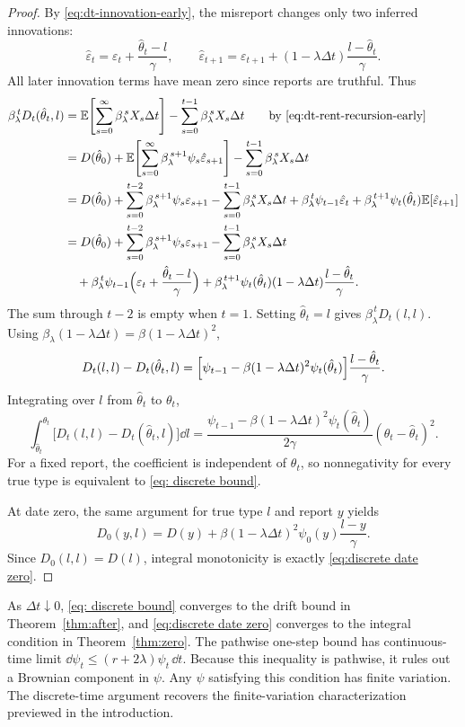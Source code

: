 \documentclass[12pt]{article}
\newcommand{\E}{\mathbb{E}}
\newcommand{\hth}{\hat\theta}
\begin{document}
\begin{proof}
\noindent By \eqref{eq:dt-innovation-early}, the misreport changes only two
inferred innovations:
\[
  \hat\varepsilon_t
  =\varepsilon_t+\frac{\hth_t-l}{\gamma},
  \qquad
  \hat\varepsilon_{t+1}
  =\varepsilon_{t+1}+(1-\lambda\Delta t)\frac{l-\hth_t}{\gamma}.
\]
All later innovation terms have
mean zero since reports are truthful. Thus
\begin{align*}
  \beta_\lambda^{\,t}D_t(\hth_t,l)
  &=\E\!\left[\sum_{s=0}^{\infty}
    \beta_\lambda^{\,s}X_s\Delta t\right]
    -\sum_{s=0}^{t-1}\beta_\lambda^{\,s}X_s\Delta t
    \qquad\text{by \eqref{eq:dt-rent-recursion-early}}\\
  &=D(\hth_0)
    +\E\!\left[\sum_{s=0}^{\infty}
      \beta_\lambda^{\,s+1}\psi_s\hat\varepsilon_{s+1}\right]
    -\sum_{s=0}^{t-1}\beta_\lambda^{\,s}X_s\Delta t\\
  &=D(\hth_0)
    +\sum_{s=0}^{t-2}\beta_\lambda^{\,s+1}\psi_s\varepsilon_{s+1}
    -\sum_{s=0}^{t-1}\beta_\lambda^{\,s}X_s\Delta t +\beta_\lambda^{\,t}\psi_{t-1}\hat\varepsilon_t
    +\beta_\lambda^{\,t+1}\psi_t(\hth_t)\E[\hat\varepsilon_{t+1}]\\
  &=D(\hth_0)
  +\sum_{s=0}^{t-2}\beta_\lambda^{\,s+1}\psi_s\varepsilon_{s+1}
  -\sum_{s=0}^{t-1}\beta_\lambda^{\,s}X_s\Delta t\\
  & \quad+\beta_\lambda^{\,t}\psi_{t-1}
   \Bigl(\varepsilon_t+\frac{\hth_t-l}{\gamma}\Bigr)
  +\beta_\lambda^{\,t+1}\psi_t(\hth_t)(1-\lambda\Delta t)
   \frac{l-\hth_t}{\gamma}.
\end{align*}
The sum through \(t-2\) is empty when \(t=1\). Setting \(\hth_t=l\) gives
\(\beta_\lambda^{\,t}D_t(l,l)\).  Using
\(\beta_\lambda(1-\lambda\Delta t)=\beta(1-\lambda\Delta t)^2\),
\[
  D_t(l,l)-D_t(\hth_t,l)
  =
  \Bigl[\psi_{t-1}-\beta(1-\lambda\Delta t)^2\psi_t(\hth_t)\Bigr]
  \frac{l-\hth_t}{\gamma}.
\]
Integrating over \(l\) from \(\hth_t\) to \(\theta_t\),
\[
  \int_{\hth_t}^{\theta_t}
  \bigl[D_t(l,l)-D_t(\hth_t,l)\bigr]\dd l
  =
  \frac{\psi_{t-1}-\beta(1-\lambda\Delta t)^2\psi_t(\hth_t)}{2\gamma}
  (\theta_t-\hth_t)^2.
\]
For a fixed report, the coefficient is independent of \(\theta_t\),
so nonnegativity for every true type is equivalent to
\eqref{eq: discrete bound}.

At date zero, the same argument for true type \(l\) and report \(y\)
yields
\[
  D_0(y,l)=D(y)+\beta(1-\lambda\Delta t)^2\psi_0(y)
  \frac{l-y}{\gamma}.
\]
Since \(D_0(l,l)=D(l)\), integral monotonicity is exactly
\eqref{eq:discrete date zero}.
\end{proof}
As \(\Delta t\downarrow0\), \eqref{eq: discrete bound} converges to
the drift bound in Theorem~\ref{thm:after}, and
\eqref{eq:discrete date zero} converges to the integral condition in
Theorem~\ref{thm:zero}. The pathwise one-step bound has continuous-time
limit
\(
\dd\psi_t\leq (r+2\lambda)\psi_t\,\dd t.
\)
Because this inequality is pathwise, it rules out a Brownian component in \(\psi\). Any
\(\psi\) satisfying this condition has finite variation. The discrete-time argument recovers
the finite-variation characterization previewed in the introduction.
\end{document}
